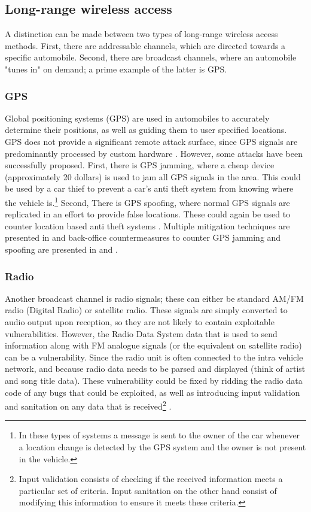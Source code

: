\subsection{Long-range wireless access}
\label{subsec:lone-range_wireless_access}

A distinction can be made between two types of long-range wireless access methods. First, there are addressable channels, which are directed towards a specific automobile. Second, there are broadcast channels, where an automobile "tunes in" on demand; a prime example of the latter is GPS.

\subsubsection{GPS} 
\label{subsubsec:gps}

Global positioning systems (GPS) are used in automobiles to accurately determine their positions, as well as guiding them to user specified locations. GPS does not provide a significant remote attack surface, since GPS signals are predominantly processed by custom hardware \cite{Kosher}. However, some attacks have been successfully proposed. First, there is GPS jamming, where a cheap device (approximately 20 dollars) is used to jam all GPS signals in the area. This could be used by a car thief to prevent a car's anti theft system from knowing where the vehicle is.\footnote{In these types  of systems a message is sent to the owner of the car whenever a location change is detected by the GPS system and the owner is not present in the vehicle.} Second, There is GPS spoofing, where normal GPS signals are replicated in an effort to provide false locations. These could again be used to counter location based anti theft systems \cite{Petit}. Multiple mitigation techniques are presented in \cite{GPS1} and back-office countermeasures to counter GPS jamming and spoofing are presented in \cite{GPS2} and \cite{GPS3}. 

\subsubsection{Radio} 
\label{subsubsec:radio}

Another broadcast channel is radio signals; these can either be standard AM/FM radio (Digital Radio) or satellite radio. These signals are simply converted to audio output upon reception, so they are not likely to contain exploitable vulnerabilities. However, the Radio Data System data that is used to send information along with FM analogue signals (or the equivalent on satellite radio) can be a vulnerability. Since the radio unit is often connected to the intra vehicle network, and because radio data needs to be parsed and displayed (think of artist and song title data). These vulnerability could be fixed by ridding the radio data code of any bugs that could be exploited, as well as introducing input validation and sanitation on any data that is received\footnote{Input validation consists of checking if the received information meets a particular set of criteria. Input sanitation on the other hand consist of modifying this information to ensure it meets these criteria.} \cite{MillerA, MillerD, Kosher}.

